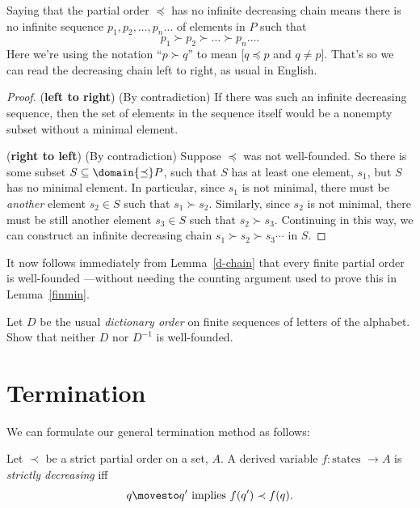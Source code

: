 Saying that the partial order $\preceq$ has no infinite decreasing chain
means there is no infinite sequence $p_1,p_2,\dots,p_n\dots$ of elements
in $P$ such that
\[
p_1 \succ p_2 \succ \dots \succ p_n \dots.
\]
Here we're using the notation ``$p \succ q$'' to mean [$q \preceq p$ and
  $q \neq p$].  That's so we can read the decreasing chain left to right,
as usual in English.

\begin{proof}
(\textbf{left to right}) (By contradiction) If there was such an infinite
decreasing sequence, then the set of elements in the sequence itself would
be a nonempty subset without a minimal element.

(\textbf{right to left}) (By contradiction) Suppose $\preceq$ was not
well-founded.  So there is some subset $S \subseteq \domain{\preceq}P$,
such that $S$ has at least one element, $s_1$, but $S$ has no minimal
element.  In particular, since $s_1$ is not minimal, there must be
\emph{another} element $s_2 \in S$ such that $s_1 \succ s_2$.  Similarly,
since $s_2$ is not minimal, there must be still another element $s_3 \in S$
such that $s_2 \succ s_3$.  Continuing in this way, we can construct an
infinite decreasing chain $s_1 \succ s_2 \succ s_3 \cdots$ in $S$.
\end{proof}

It now follows immediately from Lemma~\ref{d-chain} that every finite
partial order is well-founded ---without needing the counting argument
used to prove this in Lemma~\ref{finmin}.

\begin{problem}
Let $D$ be the usual \emph{dictionary order} on finite sequences of letters
of the alphabet.  Show that neither $D$ nor $D^{-1}$ is well-founded.

\end{problem}

\section{Termination}

We can formulate our general termination method as follows:

\begin{definition}
  Let $\prec$ be a strict partial order on a set, $A$.  A derived variable
  $f : \text{states } \to A$ is \emph{strictly decreasing} iff
\[
q \movesto q' \text{  implies  } f(q') \prec f(q).
\]
\end{definition}


